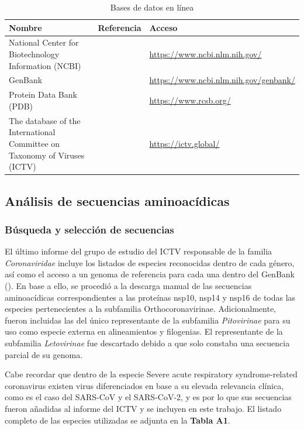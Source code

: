 \begin{table}[htbp]
    \centering
    \caption{Bases de datos en línea}\label{tab:databases}
    \scriptsize
    \setlength{\tabcolsep}{20pt} %
    \begin{tabularx}{\textwidth}{@{}p{4.5cm}p{3cm}X@{}}
    \toprule
    \textbf{Nombre} & \textbf{Referencia} & \textbf{Acceso} \\
    \midrule
    National Center for Biotechnology Information (NCBI) & \cite{sayers_database_2023} & \url{https://www.ncbi.nlm.nih.gov/} \\
    GenBank & \cite{benson_genbank_2013} & \url{https://www.ncbi.nlm.nih.gov/genbank/} \\
    Protein Data Bank (PDB) & \cite{berman_protein_2000} & \url{https://www.rcsb.org/} \\
    The database of the International Committee on Taxonomy of Viruses (ICTV) & \cite{lefkowitz_virus_2018} & \url{https://ictv.global/} \\
    \bottomrule
    \end{tabularx}
\end{table}

\subsection{Análisis de secuencias aminoacídicas}

\subsubsection{Búsqueda y selección de secuencias}

El último informe del grupo de estudio del ICTV responsable de la familia
\textit{Coronaviridae} incluye los listados de especies reconocidas dentro 
de cada género, así como el acceso a un genoma de referencia para cada una 
dentro del GenBank (\cite{woo_family_2023}). En base a ello, se procedió a 
la descarga manual de las secuencias aminoacídicas correspondientes a las 
proteínas nsp10, nsp14 y nsp16 de todas las especies pertenecientes a la 
subfamilia Orthocoronavirinae. Adicionalmente, fueron incluidas las del 
único representante de la subfamilia \textit{Pitovirinae} para su uso como 
especie externa en alineamientos y filogenias. El representante de la 
subfamilia \textit{Letovirinae} fue descartado debido a que solo constaba 
una secuencia parcial de su genoma.

Cabe recordar que dentro de la especie Severe acute respiratory 
syndrome-related coronavirus existen virus diferenciados en base a su 
elevada relevancia clínica, como es el caso del SARS-CoV y el SARS-CoV-2, y 
es por lo que sus secuencias fueron añadidas al informe del ICTV y se 
incluyen en este trabajo. El listado completo de las especies utilizadas se 
adjunta en la \textbf{Tabla A1}.

